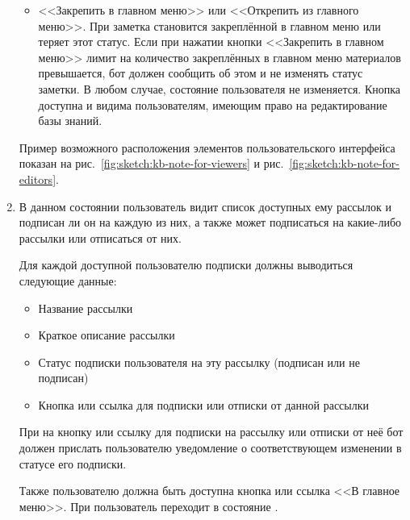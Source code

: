 \begin{enumerate}
\begin{itemize}
                \item
                    <<Закрепить в главном меню>> или <<Открепить из главного меню>>.
                    При  заметка становится закреплённой в главном меню или теряет этот
                    статус. Если при нажатии кнопки <<Закрепить в главном меню>> лимит на количество
                    закреплённых в главном меню материалов превышается, бот должен сообщить об
                    этом и не изменять статус заметки. В любом случае, состояние пользователя
                    не изменяется.
                    Кнопка доступна и видима пользователям, имеющим право на редактирование базы знаний.
            \end{itemize}

            Пример возможного расположения элементов пользовательского интерфейса показан на
            рис.~\ref{fig:sketch:kb-note-for-viewers} и
            рис.~\ref{fig:sketch:kb-note-for-editors}.

        \item \label{itm:req:ui:states:subscriptions}

            В данном состоянии пользователь видит список доступных ему рассылок и подписан ли
            он на каждую из них, а также может подписаться на какие-либо рассылки или отписаться
            от них.

            Для каждой доступной пользователю подписки должны выводиться
            следующие данные:
            \begin{itemize}
                \item
                    Название рассылки
                \item
                    Краткое описание рассылки
                \item
                    Статус подписки пользователя на эту рассылку (подписан или не подписан)
                \item
                    Кнопка или ссылка для подписки или отписки от данной рассылки
            \end{itemize}

            При  на кнопку или ссылку для подписки на рассылку или отписки от неё
            бот должен прислать пользователю уведомление о соответствующем изменении в статусе
            его подписки.

            Также пользователю должна быть доступна кнопка или ссылка <<В главное меню>>.
            При  пользователь переходит в состояние
            \hyperref[itm:req:ui:states:mainmenu]
            {}.


\end{enumerate}
